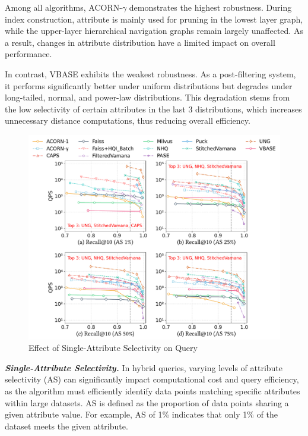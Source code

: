 \documentclass[sigconf, nonacm]{acmart}
\begin{document}
Among all algorithms, ACORN-\(\gamma\) demonstrates the highest robustness. During index construction, attribute is mainly used for pruning in the lowest layer graph, while the upper-layer hierarchical navigation graphs remain largely unaffected. As a result, changes in attribute distribution have a limited impact on overall performance.

In contrast, VBASE exhibits the weakest robustness. As a post-filtering system, it performs significantly better under uniform distributions but degrades under long-tailed, normal, and power-law distributions. This degradation stems from the low selectivity of certain attributes in the last 3 distributions, which increases unnecessary distance computations, thus reducing overall efficiency.

\begin{figure}
    \centering
    \setlength{\abovecaptionskip}{0cm}
    \setlength{\belowcaptionskip}{-0.1cm}
    \includegraphics[width=\columnwidth]{figures/exp/exp_5_1_1_SingleLabel_1thread.pdf}
    \caption{Effect of Single-Attribute Selectivity on Query}
    \label{fig:exp_5_1_1_SingleLabel_1thread}
\end{figure}


\textit{\textbf{Single-Attribute Selectivity.}}
In hybrid queries, varying levels of attribute selectivity (AS) can significantly impact computational cost and query efficiency, as the algorithm must efficiently identify data points matching specific attributes within large datasets. AS is defined as the proportion of data points sharing a given attribute value. For example, AS of 1\% indicates that only 1\% of the dataset meets the given attribute. 
\end{document}
